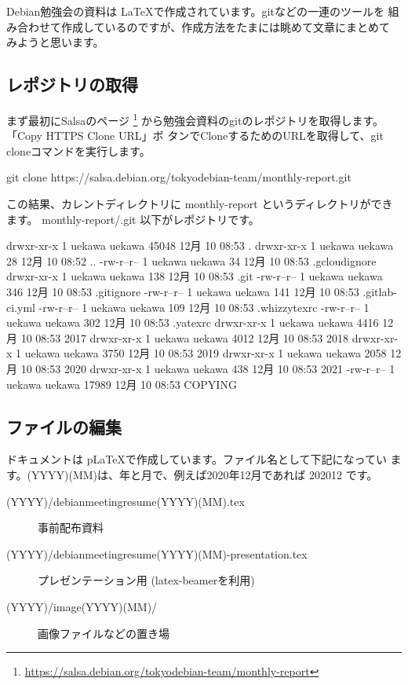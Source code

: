 \documentclass[mingoth,a4paper]{jsarticle}
\begin{document}
Debian勉強会の資料は \LaTeX で作成されています。gitなどの一連のツールを
組み合わせて作成しているのですが、作成方法をたまには眺めて文章にまとめて
みようと思います。

\subsection{レポジトリの取得}

まず最初にSalsaのページ
\footnote{\url{https://salsa.debian.org/tokyodebian-team/monthly-report}}
から勉強会資料のgitのレポジトリを取得します。「Copy HTTPS Clone URL」ボ
タンでCloneするためのURLを取得して、git cloneコマンドを実行します。

\begin{commandline}
 git clone https://salsa.debian.org/tokyodebian-team/monthly-report.git
\end{commandline}

この結果、カレントディレクトリに monthly-report というディレクトリができ
ます。
monthly-report/.git 以下がレポジトリです。

\begin{commandline}
drwxr-xr-x 1 uekawa uekawa  45048 12月 10 08:53 .
drwxr-xr-x 1 uekawa uekawa     28 12月 10 08:52 ..
-rw-r--r-- 1 uekawa uekawa     34 12月 10 08:53 .gcloudignore
drwxr-xr-x 1 uekawa uekawa    138 12月 10 08:53 .git
-rw-r--r-- 1 uekawa uekawa    346 12月 10 08:53 .gitignore
-rw-r--r-- 1 uekawa uekawa    141 12月 10 08:53 .gitlab-ci.yml
-rw-r--r-- 1 uekawa uekawa    109 12月 10 08:53 .whizzytexrc
-rw-r--r-- 1 uekawa uekawa    302 12月 10 08:53 .yatexrc
drwxr-xr-x 1 uekawa uekawa   4416 12月 10 08:53 2017
drwxr-xr-x 1 uekawa uekawa   4012 12月 10 08:53 2018
drwxr-xr-x 1 uekawa uekawa   3750 12月 10 08:53 2019
drwxr-xr-x 1 uekawa uekawa   2058 12月 10 08:53 2020
drwxr-xr-x 1 uekawa uekawa    438 12月 10 08:53 2021
-rw-r--r-- 1 uekawa uekawa  17989 12月 10 08:53 COPYING
\end{commandline}

\subsection{ファイルの編集}

ドキュメントは p\LaTeX{}で作成しています。ファイル名として下記になってい
ます。(YYYY)(MM)は、年と月で、例えば2020年12月であれば 202012 です。

\begin{description}
 \item[(YYYY)/debianmeetingresume(YYYY)(MM).tex]
	    事前配布資料
 \item[(YYYY)/debianmeetingresume(YYYY)(MM)-presentation.tex]
	    プレゼンテーション用 (latex-beamerを利用)
 \item[(YYYY)/image(YYYY)(MM)/]
	    画像ファイルなどの置き場
\end{description}
\end{document}
